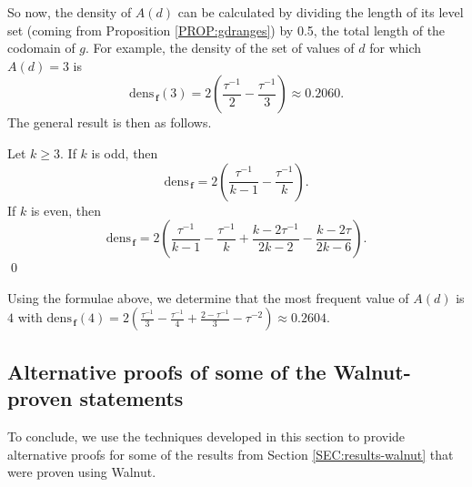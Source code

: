 \documentclass[10pt,a4paper,reqno]{amsart}
\newcommand{\bff}{{\mathbf f}}
\newcommand{\walnut}{{\ttfamily Walnut}}
\begin{document}
So now, the density of $A(d)$ can be calculated by dividing the length of its level set (coming from Proposition \ref{PROP:gdranges}) by 0.5, the total length of the codomain of $g$.
For example, the density of the set of values of $d$ for which $A(d)=3$ is
\[\mathrm{dens}_{\,\bff}(3)=2\left(\frac{\tau^{-1}}{2}-\frac{\tau^{-1}}{3}\right)\approx 0.2060.\]
The general result is then as follows.
\begin{theorem}
Let $k\geq3$. If $k$ is odd, then 
\[
\mathrm{dens}_\mathbf{\,\bff} = 2\left(\frac{\tau^{-1}}{k-1} - \frac{\tau^{-1}}{k}\right).
\]
If $k$ is even, then
\[
\mathrm{dens}_\mathbf{\,\bff} = 2\left(\frac{\tau^{-1}}{k-1} - \frac{\tau^{-1}}{k}
+ \frac{k-2\tau^{-1}}{2k-2} - \frac{k-2\tau}{2k-6}\right).
\]
\hfill\qed
\end{theorem}

Using the formulae above, we determine that the most frequent value of $A(d)$ is $4$ with $\mathrm{dens}_{\,\bff}(4)=2\left(\frac{\tau^{-1}}{3}-\frac{\tau^{-1}}{4}+\frac{2-\tau^{-1}}{3}-\tau^{-2}\right)\approx 0.2604$.


\subsection{Alternative proofs of some of the \walnut{}-proven statements}\label{SEC:altproofs}
To conclude, we use the techniques developed in this section to provide alternative proofs for some of the results from Section \ref{SEC:results-walnut} that were proven using \walnut{}.
\end{document}
